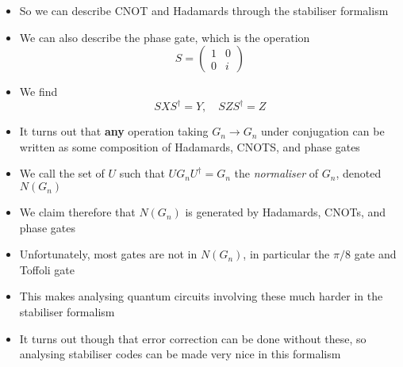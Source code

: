 \documentclass[12pt,a4paper]{article}
\numberwithin{equation}{section}
\begin{document}
\begin{itemize}
		\item So we can describe CNOT and Hadamards through the stabiliser formalism
		\item We can also describe the phase gate, which is the operation 
		\begin{equation}
			S=\begin{pmatrix}1&0\\0&i\end{pmatrix}
		\end{equation}
		\item We find
		\begin{equation}
			SXS^{\dagger}=Y,\quad SZS^{\dagger}=Z
		\end{equation}
		\item It turns out that \textbf{any} operation taking $G_{n}\to G_{n}$ under conjugation can be written as some composition of Hadamards, CNOTS, and phase gates
		\item We call the set of $U$ such that $UG_{n}U^{\dagger}=G_{n}$ the \textit{normaliser} of $G_{n}$, denoted $N(G_{n})$
		\item We claim therefore that $N(G_{n})$ is generated by Hadamards, CNOTs, and phase gates
		\item Unfortunately, most gates are not in $N(G_{n})$, in particular the $\pi/8$ gate and Toffoli gate
		\item This makes analysing quantum circuits involving these much harder in the stabiliser formalism
		\item It turns out though that error correction can be done without these, so analysing stabiliser codes can be made very nice in this formalism
	\end{itemize}
\end{document}
